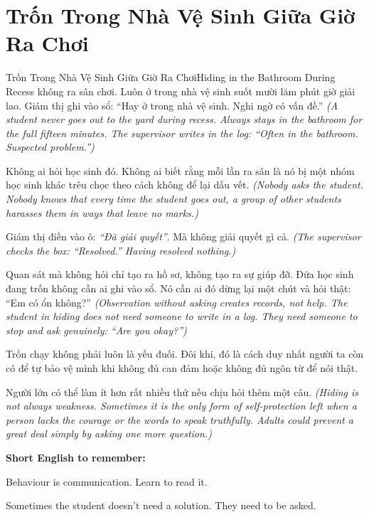 \section{Trốn Trong Nhà Vệ Sinh Giữa Giờ Ra Chơi}
\begin{truyen}{Trốn Trong Nhà Vệ Sinh Giữa Giờ Ra Chơi}{Hiding in the Bathroom During Recess}
 không ra sân chơi. Luôn ở trong nhà vệ sinh suốt mười lăm phút giờ giải lao. Giám thị ghi vào sổ: ``Hay ở trong nhà vệ sinh. Nghi ngờ có vấn đề.''
\textit{(A student never goes out to the yard during recess. Always stays in the bathroom for the full fifteen minutes. The supervisor writes in the log: ``Often in the bathroom. Suspected problem.'')}

Không ai hỏi học sinh đó. Không ai biết rằng mỗi lần ra sân là nó bị một nhóm học sinh khác trêu chọc theo cách không để lại dấu vết.
\textit{(Nobody asks the student. Nobody knows that every time the student goes out, a group of other students harasses them in ways that leave no marks.)}

Giám thị điền vào ô: \textit{``Đã giải quyết''}. Mà không giải quyết gì cả.
\textit{(The supervisor checks the box: ``Resolved.'' Having resolved nothing.)}

\begin{baihoc}
Quan sát mà không hỏi chỉ tạo ra hồ sơ, không tạo ra sự giúp đỡ. Đứa học sinh đang trốn không cần ai ghi vào sổ. Nó cần ai đó dừng lại một chút và hỏi thật: ``Em có ổn không?''
\textit{(Observation without asking creates records, not help. The student in hiding does not need someone to write in a log. They need someone to stop and ask genuinely: ``Are you okay?'')}
\end{baihoc}
\end{truyen}

\begin{baihoc}
Trốn chạy không phải luôn là yếu đuối. Đôi khi, đó là cách duy nhất người ta còn có để tự bảo vệ mình khi không đủ can đảm hoặc không đủ ngôn từ để nói thật.

Người lớn có thể làm ít hơn rất nhiều thứ nếu chịu hỏi thêm một câu.
\textit{(Hiding is not always weakness. Sometimes it is the only form of self-protection left when a person lacks the courage or the words to speak truthfully. Adults could prevent a great deal simply by asking one more question.)}
\end{baihoc}

\begin{ghinhoanh}
\textbf{Short English to remember:}

Behaviour is communication. Learn to read it.

Sometimes the student doesn't need a solution. They need to be asked.
\end{ghinhoanh}

